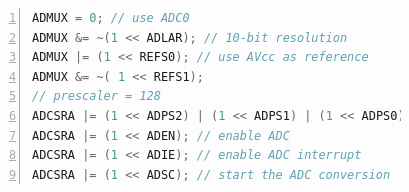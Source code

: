 \documentclass[11pt]{article}
\begin{document}
\begin{figure}[H]
\begin{minipage}{0.5\textwidth}
\centering
\begin{lstlisting}[language=C, numbers=left, stepnumber=1, caption=ADC settings, label=lst:adc]
ADMUX = 0; // use ADC0
ADMUX &= ~(1 << ADLAR); // 10-bit resolution
ADMUX |= (1 << REFS0); // use AVcc as reference
ADMUX &= ~( 1 << REFS1);
// prescaler = 128
ADCSRA |= (1 << ADPS2) | (1 << ADPS1) | (1 << ADPS0); 
ADCSRA |= (1 << ADEN); // enable ADC
ADCSRA |= (1 << ADIE); // enable ADC interrupt
ADCSRA |= (1 << ADSC); // start the ADC conversion
\end{lstlisting}
\end{minipage}
%
%
\end{figure}
\end{document}
